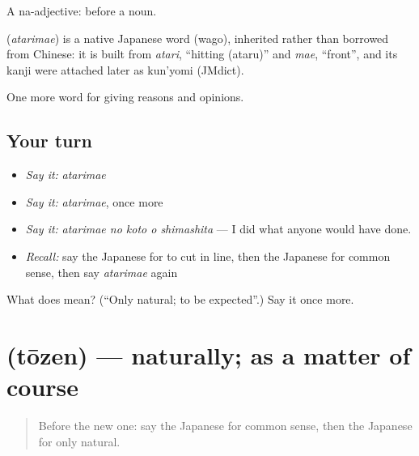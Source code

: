 A na-adjective:  before a noun.

\begin{cousinweb}
\textbf{} (\emph{atarimae}) is a native Japanese word (wago), inherited rather than borrowed from Chinese: it is built from \emph{atari}, \textquotedblleft{}hitting (ataru)\textquotedblright{} and \emph{mae}, \textquotedblleft{}front\textquotedblright{}, and its kanji were attached later as kun'yomi (JMdict).
\end{cousinweb}

\begin{grammarlens}[title={What you've built}]
One more word for giving reasons and opinions.
\end{grammarlens}

\subsection*{Your turn}
\begin{itemize}
\raggedright
  \item \emph{Say it:} \emph{atarimae}
  \item \emph{Say it:} \emph{atarimae}, once more
  \item \emph{Say it:} \emph{atarimae no koto o shimashita} — I did what anyone would have done.
  \item \emph{Recall:} say the Japanese for to cut in line, then the Japanese for common sense, then say \emph{atarimae} again
\end{itemize}

\begin{tcolorbox}[breakable,colback=teal!4,colframe=teal!35!black,title={Before you move on}]
What does  mean? (\textquotedblleft{}Only natural; to be expected\textquotedblright{}.) Say it once more.
\end{tcolorbox}
\section[\texorpdfstring{\ja{とうぜん} (tōzen)}{とうぜん (tōzen)}]{ (tōzen) — naturally; as a matter of course}

\label{lesson:JA-C329-touzen}



\begin{quote}
Before the new one: say the Japanese for common sense, then the Japanese for only natural.
\end{quote}

